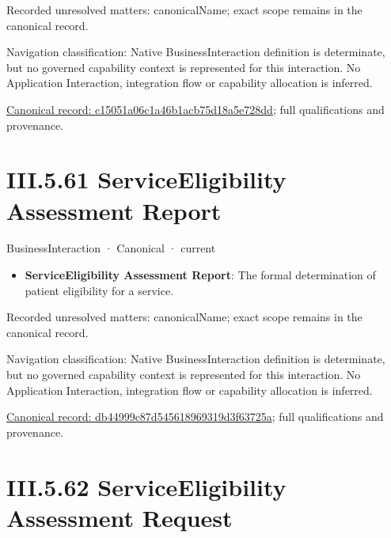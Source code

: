 {\small Recorded unresolved matters: canonicalName; exact scope remains in the canonical record.}\par
{\small Navigation classification: Native BusinessInteraction definition is determinate, but no governed capability context is represented for this interaction. No Application Interaction, integration flow or capability allocation is inferred.}\par
{\footnotesize \href{../../../../../../../../continuum/business/business-interaction/c15051a06c1a46b1acb75d18a5e728dd.md}{Canonical record: c15051a06c1a46b1acb75d18a5e728dd}; full qualifications and provenance.}\par
\section*{III.5.61 ServiceEligibility Assessment Report}
\label{navigation:III.5.61}

\label{element:db44999c87d545618969319d3f63725a}
{\small BusinessInteraction · Canonical · current}\par

\begin{itemize}


\item \textbf{ServiceEligibility Assessment Report}: The formal determination of patient eligibility for a service.

\end{itemize}

{\small Recorded unresolved matters: canonicalName; exact scope remains in the canonical record.}\par
{\small Navigation classification: Native BusinessInteraction definition is determinate, but no governed capability context is represented for this interaction. No Application Interaction, integration flow or capability allocation is inferred.}\par
{\footnotesize \href{../../../../../../../../continuum/business/business-interaction/db44999c87d545618969319d3f63725a.md}{Canonical record: db44999c87d545618969319d3f63725a}; full qualifications and provenance.}\par
\section*{III.5.62 ServiceEligibility Assessment Request}
\label{navigation:III.5.62}

